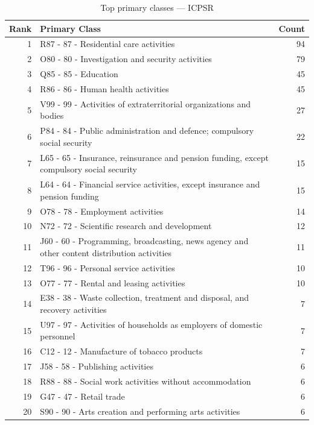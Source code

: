 \begin{table}[H]
    \centering
    \begin{tabular}{r p{10cm} r}
    \hline
    \textbf{Rank} & \textbf{Primary Class} & \textbf{Count} \\
    \hline
    1 & R87 - 87 - Residential care activities & 94 \\
    2 & O80 - 80 - Investigation and security activities & 79 \\
    3 & Q85 - 85 - Education & 45 \\
    4 & R86 - 86 - Human health activities & 45 \\
    5 & V99 - 99 - Activities of extraterritorial organizations and bodies & 27 \\
    6 & P84 - 84 - Public administration and defence; compulsory social security & 22 \\
    7 & L65 - 65 - Insurance, reinsurance and pension funding, except compulsory social security & 15 \\
    8 & L64 - 64 - Financial service activities, except insurance and pension funding & 15 \\
    9 & O78 - 78 - Employment activities & 14 \\
    10 & N72 - 72 - Scientific research and development & 12 \\
    11 & J60 - 60 - Programming, broadcasting, news agency and other content distribution activities & 11 \\
    12 & T96 - 96 - Personal service activities & 10 \\
    13 & O77 - 77 - Rental and leasing activities & 10 \\
    14 & E38 - 38 - Waste collection, treatment and disposal, and recovery activities & 7 \\
    15 & U97 - 97 - Activities of households as employers of domestic personnel & 7 \\
    16 & C12 - 12 - Manufacture of tobacco products & 7 \\
    17 & J58 - 58 - Publishing activities & 6 \\
    18 & R88 - 88 - Social work activities without accommodation & 6 \\
    19 & G47 - 47 - Retail trade & 6 \\
    20 & S90 - 90 - Arts creation and performing arts activities & 6 \\
    \hline
    \end{tabular}
    \caption{Top primary classes --- ICPSR}
\end{table}

